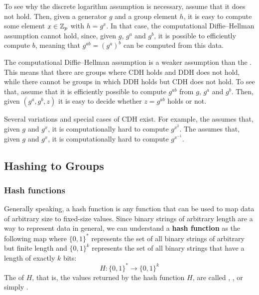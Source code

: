 To see why the discrete logarithm assumption is necessary, assume that it does not hold. Then, given a generator $g$ and a group element $h$, it is easy to compute some element $x\in\mathbb{Z}_p$ with $h=g^x$. In that case, the computational Diffie--Hellman assumption cannot hold, since, given $g$, $g^a$ and $g^b$, it is possible to efficiently compute $b$, meaning that $g^{ab}=(g^a)^b$ can be computed from this data.

The computational Diffie--Hellman assumption is a weaker assumption than the . This means that there are groups where CDH holds and DDH does not hold, while there cannot be groups in which DDH holds but CDH does not hold. To see that, assume that it is efficiently possible to compute $g^{ab}$ from $g$, $g^a$ and $g^b$. Then, given $(g^a,g^b,z)$ it is easy to decide whether $z=g^{ab}$ holds or not.

Several variations and special cases of CDH exist. For example, the  assumes that, given $g$ and $g^x$, it is computationally hard to compute $g^{x^2}$. The  assumes that, given $g$ and $g^x$, it is computationally hard to compute $g^{x^{-1}}$.

\subsection{Hashing to Groups}\label{sec:hashing-to-groups}
\subsubsection{Hash functions}\label{sec:hash-functions} Generally speaking, a hash function is any function that can be used to map data of arbitrary size to fixed-size values. Since binary strings of arbitrary length are a way to represent data in general, we can understand a \textbf{hash function} as the following map where $\{0,1\}^*$ represents the set of all binary strings of arbitrary but finite length and $\{0,1\}^k$ represents the set of all binary strings that have a length of exactly $k$ bits:
\begin{equation}
\label{def:hash_function}
H: \{0,1\}^* \to \{0,1\}^k
\end{equation}
The  of $H$, that is, the values returned by the hash function $H$, are called , , or simply .

